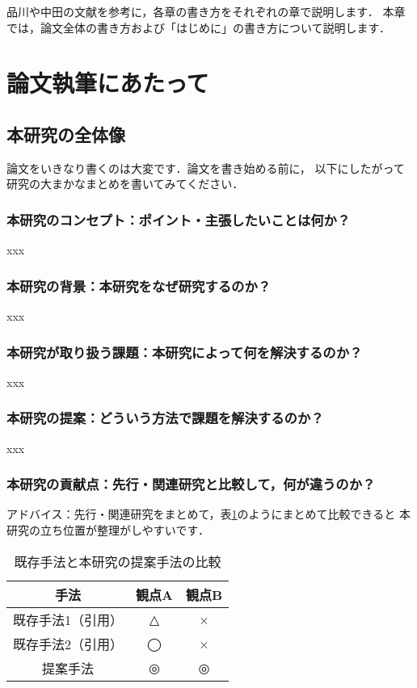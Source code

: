 品川\cite{shinagawa}や中田\cite{nakata}の文献を参考に，各章の書き方をそれぞれの章で説明します．
本章では，論文全体の書き方および「はじめに」の書き方について説明します．

\section{論文執筆にあたって}
\subsection{本研究の全体像}
論文をいきなり書くのは大変です．論文を書き始める前に，
以下にしたがって研究の大まかなまとめを書いてみてください．

\subsubsection*{本研究のコンセプト：ポイント・主張したいことは何か？}
xxx

\subsubsection*{本研究の背景：本研究をなぜ研究するのか？}
xxx

\subsubsection*{本研究が取り扱う課題：本研究によって何を解決するのか？}
xxx

\subsubsection*{本研究の提案：どういう方法で課題を解決するのか？}
xxx

\subsubsection*{本研究の貢献点：先行・関連研究と比較して，何が違うのか？}
アドバイス：先行・関連研究をまとめて，表\ref{tab:novelty}のようにまとめて比較できると
本研究の立ち位置が整理がしやすいです．

\begin{table}[tb]
    \centering
    \begin{tabular}{c|cc}
        \hline \hline
        手法 & 観点A & 観点B \\
        \hline
        既存手法1（引用） & △ & × \\
        既存手法2（引用） & ◯ & × \\
        提案手法 & ◎ & ◎ \\
        \hline 
    \end{tabular}
    \caption{既存手法と本研究の提案手法の比較}
    \label{tab:novelty}
\end{table}

